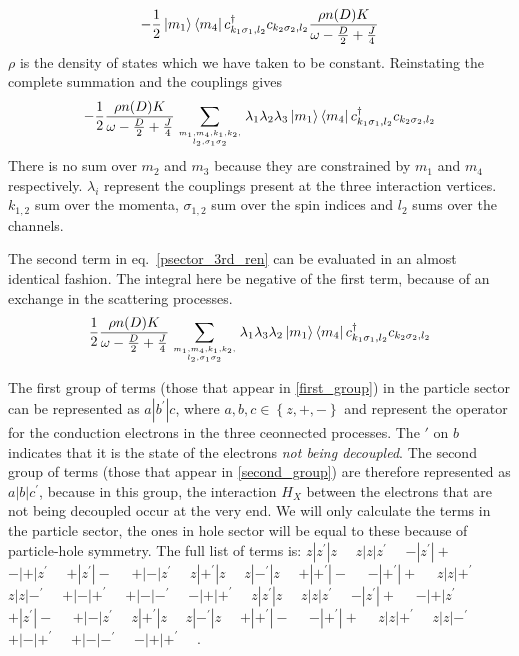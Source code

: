 \documentclass[reprint,prb,superscriptaddress]{revtex4-2}
\begin{document}
\begin{equation}\begin{aligned}
	-\frac{1}{2}\ket{m_1}\bra{m_4}c^\dagger_{k_1 \sigma_1, l_2}c_{k_2 \sigma_2,l_2} \frac{\rho n(D) K}{\omega - \frac{D}{2} + \frac{J}{4}}
\end{aligned}\end{equation}
\(\rho\) is the density of states which we have taken to be constant. Reinstating the complete summation and the couplings gives
\begin{equation}\begin{aligned}
	\label{first_group}
	-\frac{1}{2}\frac{\rho n(D) K}{\omega - \frac{D}{2} + \frac{J}{4}}\sum_{m_1,m_4,k_1,k_2,\atop{l_2,\sigma_1\sigma_2}}\lambda_{1}\lambda_{2}\lambda_{3}\ket{m_1}\bra{m_4}c^\dagger_{k_1 \sigma_1, l_2}c_{k_2 \sigma_2,l_2}
\end{aligned}\end{equation}
There is no sum over \(m_2\) and \(m_3\) because they are constrained by \(m_1\) and \(m_4\) respectively. \(\lambda_i\) represent the couplings present at the three interaction vertices. \(k_{1,2}\) sum over the momenta, \(\sigma_{1,2}\) sum over the spin indices and \(l_2\) sums over the channels.

The second term in eq.~\ref{psector_3rd_ren} can be evaluated in an almost identical fashion. The integral here be negative of the first term, because of an exchange in the scattering processes.
\begin{equation}\begin{aligned}
	\label{second_group}
	\frac{1}{2}\frac{\rho n(D) K}{\omega - \frac{D}{2} + \frac{J}{4}}\sum_{m_1,m_4,k_1,k_2,\atop{l_2,\sigma_1\sigma_2}}\lambda_{1}\lambda_{3}\lambda_{2}\ket{m_1}\bra{m_4}c^\dagger_{k_1 \sigma_1, l_2}c_{k_2 \sigma_2,l_2}
\end{aligned}\end{equation}

The first group of terms (those that appear in \ref{first_group}) in the particle sector can be represented as \(a|b^\prime|c\), where \(a,b,c \in \left\{z,+,-\right\} \) and represent the operator for the conduction electrons in the three ceonnected processes. The \(\prime\) on \(b\) indicates that it is the state of the electrons \textit{not being decoupled}. The second group of terms (those that appear in \ref{second_group}) are therefore represented as \(a|b|c^\prime\), because in this group, the interaction \(H_X\) between the electrons that are not being decoupled occur at the very end.
We will only calculate the terms in the particle sector, the ones in hole sector will be equal to these because of particle-hole symmetry. The full list of terms is: 
$z|z^\prime|z\quad$
$z|z|z^\prime\quad$
$-|z^\prime|+\quad$
$-|+|z^\prime\quad$
$+|z^\prime|-\quad$
$+|-|z^\prime\quad$
$ z|+^\prime|z\quad$
$z|-^\prime|z\quad$
$+|+^\prime|-\quad$
$-|+^\prime|+\quad$
$z|z|+^\prime\quad$
$z|z|-^\prime\quad$
$ +|-|+^\prime\quad$
$+|-|-^\prime\quad$
$-|+|+^\prime\quad$
$z|z^\prime|z\quad$
$z|z|z^\prime\quad$
$-|z^\prime|+\quad$
$ -|+|z^\prime\quad$
$+|z^\prime|-\quad$
$+|-|z^\prime\quad$
$z|+^\prime|z\quad$
$z|-^\prime|z\quad$
$+|+^\prime|-\quad$
$-|+^\prime|+\quad$
$z|z|+^\prime\quad$
$z|z|-^\prime\quad$
$+|-|+^\prime\quad$
$+|-|-^\prime\quad$
$-|+|+^\prime\quad$
.
\end{document}
